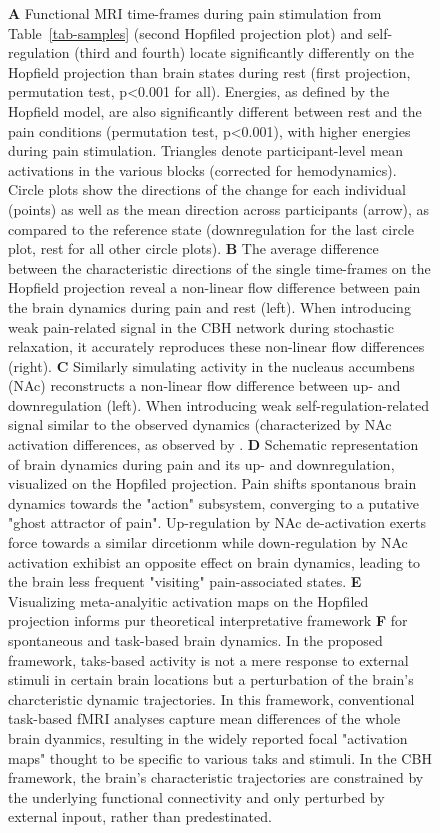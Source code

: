 \documentclass{article}
\begin{document}
\begin{figure}[!htbp]
{\textbf{A} Functional MRI time-frames during pain stimulation from Table~\ref{tab-samples} (second Hopfiled projection plot) and self-regulation (third and fourth) locate significantly differently on the Hopfield projection than brain states during rest (first projection, permutation test, p\textless 0.001 for all). Energies, as defined by the Hopfield model, are also significantly different between rest and the pain conditions (permutation test, p\textless 0.001), with higher energies during pain stimulation. Triangles denote participant-level mean activations in the various blocks (corrected for hemodynamics). Circle plots show the directions of the change for each individual (points) as well as the mean direction across participants (arrow), as compared to the reference state (downregulation for the last circle plot, rest for all other circle plots).
\textbf{B} The average difference between the characteristic directions of the single time-frames on the Hopfield projection reveal a non-linear flow difference between pain the brain dynamics during pain and rest (left). When introducing weak pain-related signal in the CBH network during stochastic relaxation, it accurately reproduces these non-linear flow differences (right).
\textbf{C} Similarly simulating activity in the nucleaus accumbens (NAc) reconstructs a non-linear flow difference between up- and downregulation (left). When introducing weak self-regulation-related signal similar to the observed dynamics (characterized by NAc activation differences, as observed by \href{https://doi.org/10.1371/journal.pbio.1002036}{}.
\textbf{D} Schematic representation of brain dynamics during pain and its up- and downregulation, visualized on the Hopfiled projection. Pain shifts spontanous brain dynamics towards the "action" subsystem, converging to a putative "ghost attractor of pain". Up-regulation by NAc de-activation exerts force towards a similar dircetionm while down-regulation by NAc activation exhibist an opposite effect on brain dynamics, leading to the brain less frequent "visiting" pain-associated states.
\textbf{E} Visualizing meta-analyitic activation maps on the Hopfiled projection informs pur theoretical interpretative framework \textbf{F}  for spontaneous and task-based brain dynamics. In the proposed framework, taks-based activity is not a mere response to external stimuli in certain brain locations but a perturbation of the brain's charcteristic dynamic trajectories. In this framework, conventional task-based fMRI analyses capture mean differences of the whole brain dyanmics, resulting in the widely reported focal "activation maps" thought to be specific to various taks and stimuli. In the CBH framework, the brain's characteristic trajectories are constrained by the underlying functional connectivity and only perturbed by external inpout, rather than predestinated.}
\label{task-validity}
\end{figure}
\end{document}
